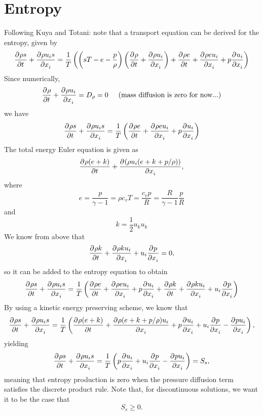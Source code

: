 \documentclass[12pt]{article}
\numberwithin{equation}{section}
\numberwithin{figure}{section}
\begin{document}
\section{Entropy}
Following Kuya and Totani: note that a transport equation can be derived for the entropy, given by
\begin{equation}
\frac{\partial^{} \rho s}{\partial t^{}} + \frac{\partial^{} \rho u_i s}{\partial x_i^{}} = \frac{1}{T}\left(\left(sT - e - \frac{p}{\rho}\right)\left(\frac{\partial^{} \rho}{\partial t^{}} + \frac{\partial^{} \rho u_i}{\partial x_i^{}}\right) + \frac{\partial^{} \rho e}{\partial t^{}} + \frac{\partial^{} \rho e u_i}{\partial x_i^{}} + p\frac{\partial^{} u_i}{\partial x_i^{}}\right)
\end{equation}
Since numerically,
\begin{equation}
\frac{\partial^{} \rho}{\partial t^{}} + \frac{\partial^{} \rho u_i}{\partial x_i^{}} = D_\rho = 0 \hspace{5mm}\textrm{(mass diffusion is zero for now...)}
\end{equation}
we have
\begin{equation}
\frac{\partial^{} \rho s}{\partial t^{}} + \frac{\partial^{} \rho u_i s}{\partial x_i^{}} = \frac{1}{T}\left(\frac{\partial^{} \rho e}{\partial t^{}} + \frac{\partial^{} \rho e u_i}{\partial x_i^{}} + p\frac{\partial^{} u_i}{\partial x_i^{}}\right)
\end{equation}
The total energy Euler equation is given as
\begin{equation}
\frac{\partial^{} \rho(e + k)}{\partial t^{}} + \frac{\partial^{} (\rho u_i (e + k + p/\rho))}{\partial x_i^{}},
\end{equation}
where
\begin{equation}
e = \frac{p}{\gamma - 1} = \rho c_v T = \frac{c_v p}{R} = \frac{R}{\gamma - 1}\frac{p}{R}
\end{equation}
and
\begin{equation}
k = \frac{1}{2}u_ku_k
\end{equation}
We know from above that
\begin{equation}
\frac{\partial^{} \rho k}{\partial t^{}} + \frac{\partial^{} \rho k u_i}{\partial x_i^{}} + u_i\frac{\partial^{} p}{\partial x_i^{}} = 0,
\end{equation}
so it can be added to the entropy equation to obtain
\begin{equation}
\frac{\partial^{} \rho s}{\partial t^{}} + \frac{\partial^{} \rho u_i s}{\partial x_i^{}}
=\frac{1}{T}\left(\frac{\partial^{} \rho e}{\partial t^{}} + \frac{\partial^{} \rho e u_i}{\partial x_i^{}} + p\frac{\partial^{} u_i}{\partial x_i^{}} + \frac{\partial^{} \rho k}{\partial t^{}} + \frac{\partial^{} \rho k u_i}{\partial x_i^{}} + u_i\frac{\partial^{} p}{\partial x_i^{}}\right)
\end{equation}
By using a kinetic energy preserving scheme, we know that
\begin{equation}
\frac{\partial^{} \rho s}{\partial t^{}} + \frac{\partial^{} \rho u_i s}{\partial x_i^{}}
=\frac{1}{T}\left(\frac{\partial^{} \rho (e + k)}{\partial t^{}} + \frac{\partial^{} \rho (e + k + p/\rho) u_i}{\partial x_i^{}} + p\frac{\partial^{} u_i}{\partial x_i^{}} + u_i\frac{\partial^{} p}{\partial x_i^{}} - \frac{\partial^{} p u_i}{\partial x_i^{}}\right),
\end{equation}
yielding
\begin{equation}
\frac{\partial^{} \rho s}{\partial t^{}} + \frac{\partial^{} \rho u_i s}{\partial x_i^{}}
=\frac{1}{T}\left(p\frac{\partial^{} u_i}{\partial x_i^{}} + u_i\frac{\partial^{} p}{\partial x_i^{}} - \frac{\partial^{} p u_i}{\partial x_i^{}}\right) = S_s,
\end{equation}
meaning that entropy production is zero when the pressure diffusion term satisfies the discrete product rule.
Note that, for discontinuous solutions, we want it to be the case that
\begin{equation}
S_s \geq 0.
\end{equation}
\end{document}
